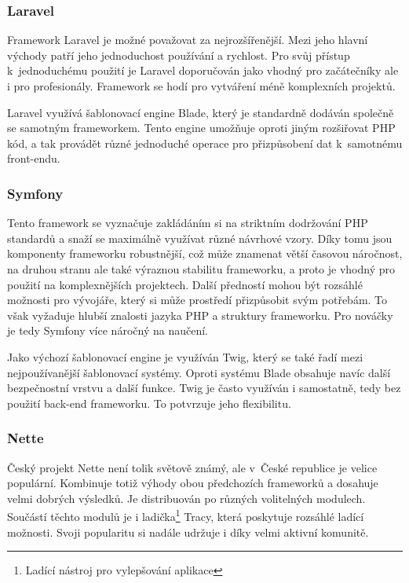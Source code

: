 \documentclass[czech,BP]{thesiskiv}
\begin{document}
	\subsubsection{Laravel}
	\par Framework Laravel je možné považovat za nejrozšířenější. Mezi jeho hlavní východy patří jeho jednoduchost používání a rychlost. Pro svůj přístup k~jednoduchému použití je Laravel doporučován jako vhodný pro začátečníky ale i pro profesionály. Framework se hodí pro vytváření méně komplexních projektů.
	\par Laravel využívá šablonovací engine Blade, který je standardně dodáván společně se samotným frameworkem. Tento engine umožňuje oproti jiným rozšiřovat PHP kód, a tak provádět různé jednoduché operace pro přizpůsobení dat k~samotnému front-endu.
	\subsubsection{Symfony}
	\par Tento framework se vyznačuje zakládáním si na striktním dodržování PHP standardů a snaží se maximálně využívat různé návrhové vzory. Díky tomu jsou komponenty frameworku robustnější, což může znamenat větší časovou náročnost, na druhou stranu ale také výraznou stabilitu frameworku, a proto je vhodný pro použití na komplexnějších projektech. Další předností mohou být rozsáhlé možnosti pro vývojáře, který si může prostředí přizpůsobit svým potřebám. To však vyžaduje hlubší znalosti jazyka PHP a struktury frameworku. Pro nováčky je tedy Symfony více náročný na naučení.
	\par Jako výchozí šablonovací engine je využíván Twig, který se také řadí mezi nejpoužívanější šablonovací systémy. Oproti systému Blade obsahuje navíc další bezpečnostní vrstvu a další funkce. Twig je často využíván i samostatně, tedy bez použití back-end frameworku. To potvrzuje jeho flexibilitu.
	\subsubsection{Nette}
	\par Český projekt Nette není tolik světově známý, ale v~České republice je velice populární. Kombinuje totiž výhody obou předchozích frameworků a dosahuje velmi dobrých výsledků. Je distribuován po různých volitelných modulech. Součástí těchto modulů je i ladička\footnote{Ladící nástroj pro vylepšování aplikace} Tracy, která poskytuje rozsáhlé ladící možnosti. Svoji popularitu si nadále udržuje i díky velmi aktivní komunitě.
\end{document}
